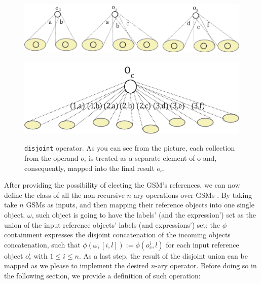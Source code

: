 \begin{figure}[!t]
	\centering
  \begin{minipage}[t]{0.9\textwidth}
	 \centering
	\includegraphics[scale=0.8]{fig/05language/01disjoint_input.pdf}
	\label{fig:disjoperands}
\end{minipage}
\begin{minipage}[t]{0.6\textwidth}
	\centering
	\includegraphics[scale=0.8]{fig/05language/02disjoint_output.pdf}
	\label{fig:disjsol}
\end{minipage}
\caption{\texttt{disjoint} operator. As you can see from the picture, each collection from the operand $o_i$ is treated as a separate element of o and, consequently, mapped into the final result $o_c$.}
\label{fig:disjoint}
\end{figure}

After providing the possibility of electing the GSM's references, we can now define the class of all the non-recursive $n$-ary operations over GSMs . By taking take $n$ GSMs as inputs, and then mapping  their reference objects into one single object, ${\omega}$, such object is going to have the labels' (and the expression') set as the union of the input reference objects' labels (and expressions') set; the $\phi$ containment expresses the disjoint concatenation of the incoming objects concatenation, such that $\phi(\omega,[i,l]):=\phi(o_c^i,l)$ for each input reference object $o_c^i$ with $1\leq i\leq n$. As a last step, the result of the disjoint union can be mapped as we please to implement the desired $n$-ary operator. Before doing so in the following section, we provide a definition of such operation:

